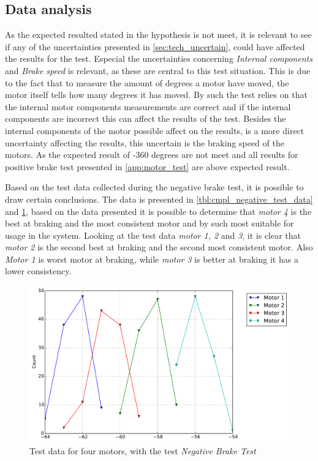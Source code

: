 \subsection{Data analysis}
As the expected resulted stated in the hypothesis is not meet, it is relevant to see if any of the uncertainties presented in \cref{sec:tech_uncertain}, could have affected the results for the test. Especial the uncertainties concerning \emph{Internal components} and \emph{Brake speed} is relevant, as these are central to this test situation. This is due to the fact that to measure the amount of degrees a motor have moved, the motor itself tells how many degrees it has moved. By such the test relies on that the internal motor components measurements are correct and if the internal components are incorrect this can affect the results of the test. Besides the internal components of the motor possible affect on the results, is a more direct uncertainty affecting the results, this uncertain is the braking speed of the motors. As the expected result of -360 degrees are not meet and all results for positive brake test presented in \cref{app:motor_test} are above expected result.

Based on the test data collected during the negative brake test, it is possible to draw certain conclusions. The data is presented in \cref{tbl:cmpl_negative_test_data} and \cref{fig:cmp_all_negative}, based on the data presented it is possible to determine that \emph{motor 4} is the best at braking and the most consistent motor and by such most suitable for usage in the system. Looking at the test data \emph{motor 1, 2} and \emph{3}, it is clear that \emph{motor 2} is the second best at braking and the second most consistent motor. Also \emph{Motor 1} is worst motor at braking, while \emph{motor 3} is better at braking it has a lower consistency.
\begin{figure}[ht]
  \centering
  \includegraphics[scale=0.5]{graphics/test_graphs/Break_negative_lineplot.pdf}
  \caption{Test data for four motors, with the test \emph{Negative Brake Test}}
  \label{fig:cmp_all_negative}
\end{figure}

